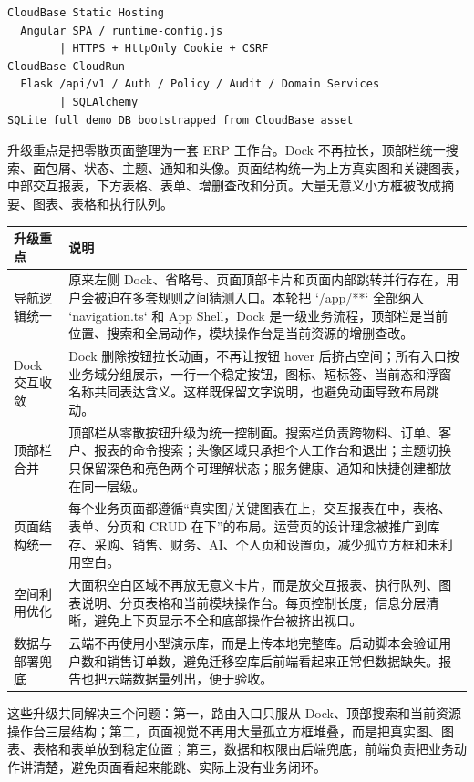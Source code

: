 \documentclass[UTF8,zihao=-4]{ctexart}
\renewcommand{\arraystretch}{1.2}
\begin{document}
\begin{verbatim}
CloudBase Static Hosting
  Angular SPA / runtime-config.js
        | HTTPS + HttpOnly Cookie + CSRF
CloudBase CloudRun
  Flask /api/v1 / Auth / Policy / Audit / Domain Services
        | SQLAlchemy
SQLite full demo DB bootstrapped from CloudBase asset
\end{verbatim}

升级重点是把零散页面整理为一套 ERP 工作台。Dock 不再拉长，顶部栏统一搜索、面包屑、状态、主题、通知和头像。页面结构统一为上方真实图和关键图表，中部交互报表，下方表格、表单、增删查改和分页。大量无意义小方框被改成摘要、图表、表格和执行队列。

\begingroup
\small
\renewcommand{\arraystretch}{1.06}
\begin{tabularx}{\textwidth}{p{}X}
\toprule
升级重点 & 说明 \\
\midrule
导航逻辑统一 & 原来左侧 Dock、省略号、页面顶部卡片和页面内部跳转并行存在，用户会被迫在多套规则之间猜测入口。本轮把 `/app/**` 全部纳入 `navigation.ts` 和 App Shell，Dock 是一级业务流程，顶部栏是当前位置、搜索和全局动作，模块操作台是当前资源的增删查改。 \\
Dock 交互收敛 & Dock 删除按钮拉长动画，不再让按钮 hover 后挤占空间；所有入口按业务域分组展示，一行一个稳定按钮，图标、短标签、当前态和浮窗名称共同表达含义。这样既保留文字说明，也避免动画导致布局跳动。 \\
顶部栏合并 & 顶部栏从零散按钮升级为统一控制面。搜索栏负责跨物料、订单、客户、报表的命令搜索；头像区域只承担个人工作台和退出；主题切换只保留深色和亮色两个可理解状态；服务健康、通知和快捷创建都放在同一层级。 \\
页面结构统一 & 每个业务页面都遵循“真实图/关键图表在上，交互报表在中，表格、表单、分页和 CRUD 在下”的布局。运营页的设计理念被推广到库存、采购、销售、财务、AI、个人页和设置页，减少孤立方框和未利用空白。 \\
空间利用优化 & 大面积空白区域不再放无意义卡片，而是放交互报表、执行队列、图表说明、分页表格和当前模块操作台。每页控制长度，信息分层清晰，避免上下页显示不全和底部操作台被挤出视口。 \\
数据与部署兜底 & 云端不再使用小型演示库，而是上传本地完整库。启动脚本会验证用户数和销售订单数，避免迁移空库后前端看起来正常但数据缺失。报告也把云端数据量列出，便于验收。 \\
\bottomrule
\end{tabularx}
\endgroup

\vspace{0.55em}
这些升级共同解决三个问题：第一，路由入口只服从 Dock、顶部搜索和当前资源操作台三层结构；第二，页面视觉不再用大量孤立方框堆叠，而是把真实图、图表、表格和表单放到稳定位置；第三，数据和权限由后端兜底，前端负责把业务动作讲清楚，避免页面看起来能跳、实际上没有业务闭环。
\clearpage
\end{document}
